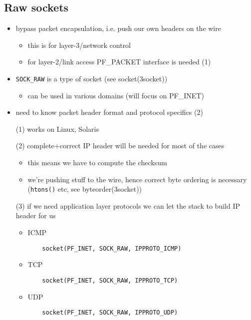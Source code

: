 
\subsection{Raw sockets}

\begin{itemize}
  \item bypass packet encapsulation, i.e. push our own headers on the wire
    \begin{itemize}
      \item this is for layer-3/network control
      \item for layer-2/link access PF\_PACKET interface is needed (1)
    \end{itemize}
  \item \texttt{SOCK\_RAW} is a type of socket (see socket(3socket))
    \begin{itemize}
      \item can be used in various domains (will focus on PF\_INET)
    \end{itemize}
  \item need to know packet header format and protocol specifics (2)
\end{itemize}



\begin{itemize}
  \item[(1)] works on Linux, Solaris
  \item[(2)] complete+correct IP header will be needed for most of the cases
    \begin{itemize}
    \item this means we have to compute the checksum
    \item we're pushing stuff to the wire, hence correct byte ordering is
        necessary (\texttt{htons()} etc, see byteorder(3socket))
    \end{itemize}
  \item[(3)] if we need application layer protocols we can let the stack to
    build IP header for us
    \begin{itemize}
    \item ICMP
\begin{verbatim}
    socket(PF_INET, SOCK_RAW, IPPROTO_ICMP)
\end{verbatim}
    \item TCP
\begin{verbatim}
    socket(PF_INET, SOCK_RAW, IPPROTO_TCP)
\end{verbatim}
    \item UDP
\begin{verbatim}
    socket(PF_INET, SOCK_RAW, IPPROTO_UDP)
\end{verbatim}
    \end{itemize}
\end{itemize}

